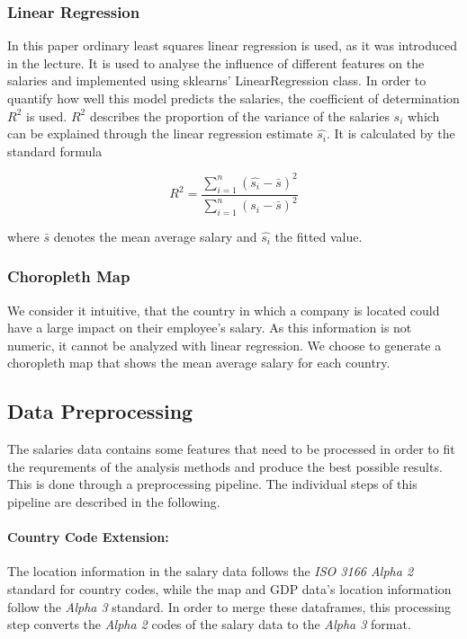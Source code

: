 \documentclass{article}
\begin{document}
\subsubsection{Linear Regression}
In this paper ordinary least squares linear regression is used, as it was introduced in the lecture. It is used to analyse the influence of different features on the salaries and implemented using sklearns' LinearRegression class. In order to quantify how well this model predicts the salaries, the coefficient of determination $R^2$ is used. $R^2$ describes the proportion of the variance of the salaries $s_i$ which can be explained through the linear regression estimate $\hat{s_i}$. It is calculated by the standard formula

\begin{equation}
    R^2 = \frac{\sum_{i=1}^{n} (\hat{s_i} - \bar{s})^2}{\sum_{i=1}^n ({s_i} - \bar{s})^2}
\end{equation}

where $\bar{s}$ denotes the mean average salary and $\hat{s_i}$ the fitted value. 


\subsubsection{Choropleth Map} %
We consider it intuitive, that the country in which a company is located could have a large impact on their employee's salary. As this information is not numeric, it cannot be analyzed with linear regression. We choose to generate a choropleth map that shows the mean average salary for each country.

\subsection{Data Preprocessing}
The salaries data contains some features that need to be processed in order to fit the requrements of the analysis methods and produce the best possible results. This is done through a preprocessing pipeline. The individual steps of this pipeline are described in the following.

\paragraph{Country Code Extension:}
The location information in the salary data follows the \textit{ISO 3166 Alpha 2} standard for country codes, while the map and GDP data's location information follow the \textit{Alpha 3} standard. In order to merge these dataframes, this processing step converts the \textit{Alpha 2} codes of the salary data to the \textit{Alpha 3} format.
\end{document}
